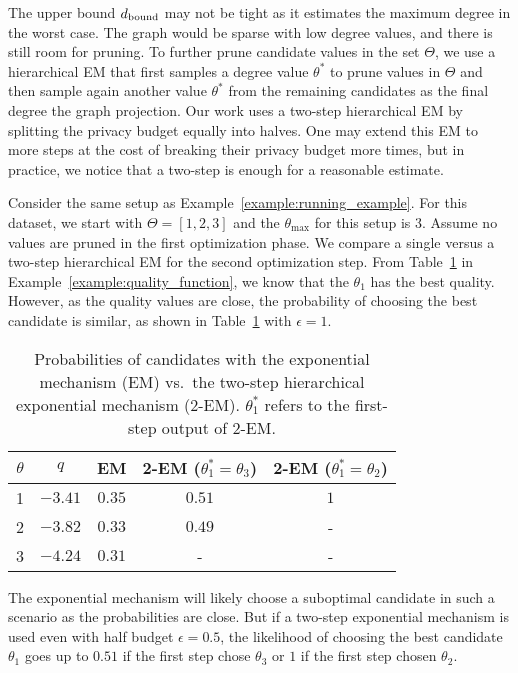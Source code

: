 \label{sec:dc_aware_hier_expo_mech}
The upper bound $d_{\normalfont{\text{bound}}}$ may not be tight as it estimates the maximum degree in the worst case. The graph would be sparse with low degree values, and there is still room for pruning. 
To further prune candidate values in the set $\Theta$, we use a hierarchical EM that first samples a degree value $\theta^*$ to prune values in $\Theta$ and then sample again another value $\theta^*$ from the remaining candidates as the final degree the graph projection. 
Our work uses a two-step hierarchical EM by splitting the privacy budget equally into halves. One may extend this EM to more steps at the cost of breaking their privacy budget more times, but in practice, we notice that a two-step is enough for a reasonable estimate. 

\begin{example}\label{example:parameter_selection} 
    Consider the same setup as Example~\ref{example:running_example}. For this dataset, we start with $\Theta = [1, 2, 3]$ and %
    the $\theta_{\max}$ for this setup is 3. Assume no values are pruned in the first optimization phase. 
    We compare a single versus a two-step hierarchical EM for the second optimization step. From Table~\ref{tab:example_expo_prob} in Example~\ref{example:quality_function}, we know that the $\theta_1$ has the best quality. However, as the quality values are close, the probability of choosing the best candidate is similar, as shown in Table~\ref{tab:example_expo_prob} with $\epsilon=1$.
    \begin{table}[]
        \centering
        \begin{tabular}{|c|c|c|c|c|}
             \hline
             $\theta$ & $q$ & EM & 2-EM ($\theta^*_1 = \theta_3$) & 2-EM ($\theta^*_1 = \theta_2$)\\
             \hline
             1 & $-3.41$ & $0.35$ & $0.51$ & $1$\\
             2 & $-3.82$ & $0.33$ & $0.49$ & -\\
             3 & $-4.24$ & $0.31$ & - & -\\
             \hline
        \end{tabular}
        \caption{Probabilities of candidates with the exponential mechanism (EM) vs.~the two-step hierarchical exponential mechanism (2-EM). $\theta^*_1$ refers to the first-step output of 2-EM.}
        \label{tab:example_expo_prob}
    \end{table}
    The exponential mechanism will likely choose a suboptimal candidate in such a scenario as the probabilities are close. But if a two-step exponential mechanism is used even with half budget $\epsilon = 0.5$, the likelihood of choosing the best candidate $\theta_1$ goes up to $0.51$ if the first step chose $\theta_3$ or $1$ if the first step chosen $\theta_2$.
\end{example}


